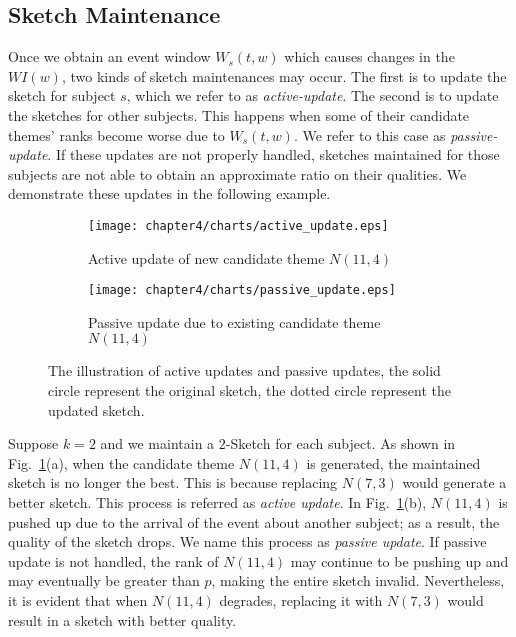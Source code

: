 \subsection{Sketch Maintenance}
\label{subsec:sketch_main}
Once we obtain an event window $W_s(t,w)$ which causes changes in the $WI(w)$, two kinds of sketch maintenances may occur. The first is 
to update the sketch for subject $s$, which we refer to as \emph{active-update}. The second is to update the sketches for other subjects. This happens when some of their candidate themes' ranks  become worse due to $W_s(t,w)$. We refer to this case as \emph{passive-update}. If these updates are not properly handled, sketches maintained for those subjects are not able to obtain an approximate ratio on their qualities. We demonstrate these updates in the following example.

\begin{figure}
	\centering
    \begin{subfigure}[b]{0.38\textwidth}
        \texttt{[image: chapter4/charts/active\_update.eps]}
        \caption{Active update of new candidate theme $N(11,4)$}
    \end{subfigure}
    \begin{subfigure}[b]{0.38\textwidth}
        \texttt{[image: chapter4/charts/passive\_update.eps]}
        \caption{Passive update due to existing candidate theme $N(11,4)$ }
    \end{subfigure}
    \caption{The illustration of active updates and passive updates, the solid circle represent the original
    sketch, the dotted circle represent the updated sketch.}
    \label{fig:sketch_maintenance}
\end{figure}


\begin{example}
Suppose $k = 2$ and we maintain a $2$-Sketch for each subject. As shown in Fig.~\ref{fig:sketch_maintenance}(a), 
when the candidate theme $N(11,4)$ is generated, the maintained sketch is no longer the best. This is because replacing 
$N(7,3)$ would generate a better sketch. This process is referred as \emph{active update}.
In Fig.~\ref{fig:sketch_maintenance}(b), $N(11,4)$ is pushed up due to the arrival of the event about another subject; as a result, the quality of the sketch drops. We name this process as \emph{passive update}. If passive update is not handled, the rank of $N(11,4)$ may continue to be pushing up and may eventually be greater than $p$, making the entire sketch invalid. Nevertheless, it is evident that when $N(11,4)$ degrades, replacing it with $N(7,3)$ would
result in a sketch with better quality. 
\end{example}

